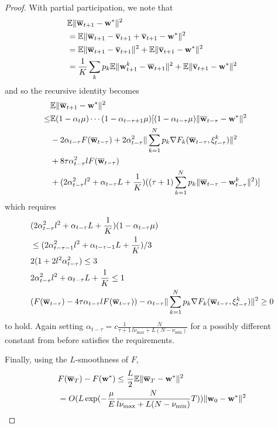 \begin{proof}
	With partial participation, we note that 
	\begin{align*}
	 & \mathbb{E}\|{\overline{\mathbf{w}}}_{t+1}-{\mathbf{w}}^{\ast}\|^{2}  \\
	& =\mathbb{E}\|{\overline{\mathbf{w}}}_{t+1}-{\overline{\mathbf{v}}}_{t+1}+{\overline{\mathbf{v}}}_{t+1}-{\mathbf{w}}^{\ast}\|^{2}\\
	& =\mathbb{E}\|{\overline{\mathbf{w}}}_{t+1}-{\overline{\mathbf{v}}}_{t+1}\|^{2}+\mathbb{E}\|{\overline{\mathbf{v}}}_{t+1}-{\mathbf{w}}^{\ast}\|^{2}\\
	& =\frac{1}{K}\sum_{k}p_{k}\mathbb{E}\|{\mathbf{w}}_{t+1}^{k}-{\overline{\mathbf{w}}}_{t+1}\|^{2}+\mathbb{E}\|{\overline{\mathbf{v}}}_{t+1}-{\mathbf{w}}^{\ast}\|^{2}
	\end{align*}
	and so the recursive identity becomes 
	\begin{align*}
	& \mathbb{E}\|{\overline{\mathbf{w}}}_{t+1}-{\mathbf{w}}^{\ast}\|^{2} \\
	\leq&\mathbb{E}(1-\alpha_{t}\mu)\cdots(1-\alpha_{t-\tau+1}\mu)[(1-\alpha_{t-\tau}\mu)\|{\overline{\mathbf{w}}}_{t-\tau}-{\mathbf{w}}^{\ast}\|^{2}\\
	& -2\alpha_{t-\tau}F({\overline{\mathbf{w}}}_{t-\tau})+2\alpha_{t-\tau}^{2}\|\sum_{k=1}^{N}p_{k}\nabla F_{k}({\overline{\mathbf{w}}}_{t-\tau},\xi_{t-\tau}^{k})\|^{2}\\
	& +8\tau\alpha_{t-\tau}^{2}lF({\overline{\mathbf{w}}}_{t-\tau})\\
	& +(2\alpha_{t-\tau}^{2}l^{2}+\alpha_{t-\tau}L+\frac{1}{K})((\tau+1)\sum_{k=1}^{N}p_{k}\|{\overline{\mathbf{w}}}_{t-\tau}-{\mathbf{w}}_{t-\tau}^{k}\|^{2})]
	\end{align*}
	which requires 
	\begin{align*}
	& (2\alpha_{t-\tau}^{2}l^{2}+\alpha_{t-\tau}L+\frac{1}{K})(1-\alpha_{t-\tau}\mu) \\
	& \leq(2\alpha_{t-\tau-1}^{2}l^{2}+\alpha_{t-\tau-1}L+\frac{1}{K})/3\\
	& 2(1+2l^{2}\alpha_{t-\tau}^{2})  \leq3\\
	& 2\alpha_{t-\tau}^{2}l^{2}+\alpha_{t-\tau}L+\frac{1}{K} \leq1\\
	& (F({\overline{\mathbf{w}}}_{t-\tau})-4\tau\alpha_{t-\tau}lF({\overline{\mathbf{w}}}_{t-\tau}))-\alpha_{t-\tau}\|\sum_{k=1}^{N}p_{k}\nabla F_{k}({\overline{\mathbf{w}}}_{t-\tau},\xi_{t-\tau}^{k})\|^{2}  \geq0
	\end{align*}
	to hold. Again setting $\alpha_{t-\tau}=c\frac{1}{\tau+1}\frac{N}{l\nu_{\max}+L(N-\nu_{\min})}$
	for a possibly different constant from before satisfies the requirements.
	
	Finally, using the $L$-smoothness of $F$, 
	\begin{align*}
	& F({\overline{\mathbf{w}}}_{T})-F({\mathbf{w}}^{\ast})  \leq\frac{L}{2}\mathbb{E}\|{\overline{\mathbf{w}}}_{T}-{\mathbf{w}}^{\ast}\|^{2}\\
	& =O(L\exp(-\frac{\mu}{E}\frac{N}{l\nu_{\max}+L(N-\nu_{\min})}T))\|{\mathbf{w}}_{0}-{\mathbf{w}}^{\ast}\|^{2}
	\end{align*}
\end{proof}

